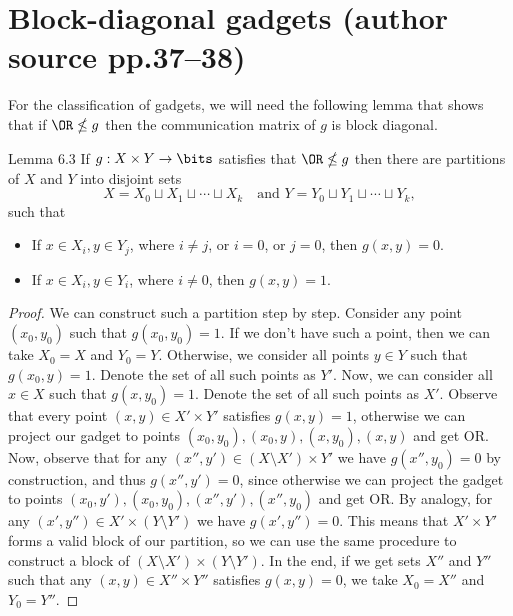 \section*{Block-diagonal gadgets (author source pp.37--38)}
For the classification of gadgets, we will need the following lemma that shows that if $\OR\nleq g$ then the communication matrix of $g$ is block diagonal.
\begin{originalresult}{Lemma 6.3}
If $g:X\times Y\to\bits$ satisfies that $\OR\nleq g$ then there are partitions of $X$ and $Y$ into disjoint sets
\[X=X_0\sqcup X_1\sqcup\cdots\sqcup X_k\quad\text{and }Y=Y_0\sqcup Y_1\sqcup\cdots\sqcup Y_k,\]
such that
\begin{itemize}
\item If $x\in X_i,y\in Y_j$, where $i\ne j$, or $i=0$, or $j=0$, then $g(x,y)=0$.
\item If $x\in X_i,y\in Y_i$, where $i\ne0$, then $g(x,y)=1$.
\end{itemize}
\end{originalresult}
\begin{proof}
We can construct such a partition step by step. Consider any point $(x_0,y_0)$ such that $g(x_0,y_0)=1$. If we don't have such a point, then we can take $X_0=X$ and $Y_0=Y$. Otherwise, we consider all points $y\in Y$ such that $g(x_0,y)=1$. Denote the set of all such points as $Y'$. Now, we can consider all $x\in X$ such that $g(x,y_0)=1$. Denote the set of all such points as $X'$. Observe that every point $(x,y)\in X'\times Y'$ satisfies $g(x,y)=1$, otherwise we can project our gadget to points $(x_0,y_0),(x_0,y),(x,y_0),(x,y)$ and get OR.
Now, observe that for any $(x'',y')\in(X\setminus X')\times Y'$ we have $g(x'',y_0)=0$ by construction, and thus $g(x'',y')=0$, since otherwise we can project the gadget to points $(x_0,y'),(x_0,y_0),(x'',y'),(x'',y_0)$ and get OR. By analogy, for any $(x',y'')\in X'\times(Y\setminus Y')$ we have $g(x',y'')=0$.
This means that $X'\times Y'$ forms a valid block of our partition, so we can use the same procedure to construct a block of $(X\setminus X')\times(Y\setminus Y')$. In the end, if we get sets $X''$ and $Y''$ such that any $(x,y)\in X''\times Y''$ satisfies $g(x,y)=0$, we take $X_0=X''$ and $Y_0=Y''$.
\end{proof}
